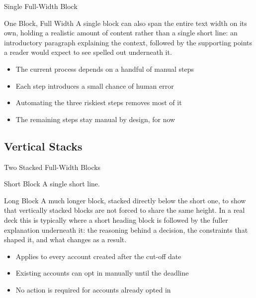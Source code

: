 \documentclass[aspectratio=169]{beamer}
\begin{document}
\begin{frame}{Single Full-Width Block}
  \begin{block}{One Block, Full Width}
    {\small A single block can also span the entire text width on its
    own, holding a realistic amount of content rather than a single
    short line: an introductory paragraph explaining the context,
    followed by the supporting points a reader would expect to see
    spelled out underneath it.}
    \begin{itemize}
      \item The current process depends on a handful of manual steps
      \item Each step introduces a small chance of human error
      \item Automating the three riskiest steps removes most of it
      \item The remaining steps stay manual by design, for now
    \end{itemize}
  \end{block}
\end{frame}

\subsection{Vertical Stacks}

\begin{frame}{Two Stacked Full-Width Blocks}
  \begin{block}{Short Block}
    {\small A single short line.}
  \end{block}
  \begin{block}{Long Block}
    {\small A much longer block, stacked directly below the short one,
    to show that vertically stacked blocks are not forced to share
    the same height. In a real deck this is typically where a short
    heading block is followed by the fuller explanation underneath
    it: the reasoning behind a decision, the constraints that shaped
    it, and what changes as a result.}
    \begin{itemize}
      \item Applies to every account created after the cut-off date
      \item Existing accounts can opt in manually until the deadline
      \item No action is required for accounts already opted in
    \end{itemize}
  \end{block}
\end{frame}
\end{document}
